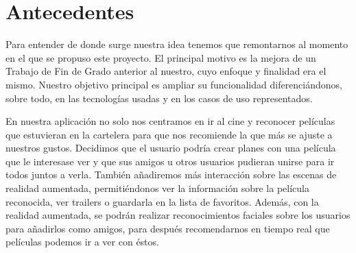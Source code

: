 


\section{Antecedentes}
\label{makereference1.1}

Para entender de donde surge nuestra idea tenemos que remontarnos al momento en el que se propuso este proyecto.
El principal motivo es la mejora de un Trabajo de Fin de Grado anterior
 al nuestro\cite{TFGRA16}, cuyo enfoque y finalidad era el mismo. Nuestro objetivo principal es 
 ampliar su funcionalidad diferenciándonos, sobre todo, en las tecnologías usadas y 
 en los casos de uso representados.

 En nuestra aplicación no solo nos centramos en ir al cine y reconocer películas que estuvieran en la cartelera
 para que nos recomiende la que más se ajuste a nuestros gustos. Decidimos que el usuario podría crear planes con
 una película que le interesase ver y que sus amigos u otros usuarios pudieran unirse para ir todos juntos a verla.
 También añadiremos más interacción sobre las escenas de realidad aumentada, permitiéndonos ver la información sobre la 
 película reconocida, ver trailers o guardarla en la lista de favoritos. Además, con la realidad aumentada,
 se podrán realizar reconocimientos faciales sobre los usuarios para añadirlos como amigos, para después recomendarnos en tiempo real
 que películas podemos ir a ver con éstos.

